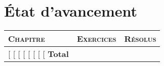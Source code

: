 \chapter*{État d'avancement}

\begin{center}
\small
\begin{tabular}{lrr}
\toprule
\textsc{Chapitre} & \textsc{Exercices} & \textsc{Résolus} \\
\midrule
[%
  [%
  [%
    [%
  [%
  [%
  [%
[%
  \textbf{Total} & 
  \textbf{[%
  \textbf{[%
\bottomrule
\end{tabular}
\end{center}

